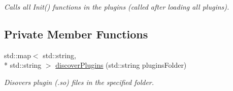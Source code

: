 \begin{DoxyCompactItemize}
\begin{DoxyCompactList}\small\item\em Calls all Init() functions in the plugins (called after loading all plugins). \end{DoxyCompactList}\end{DoxyCompactItemize}
\subsection*{Private Member Functions}
\begin{DoxyCompactItemize}
\item 
\hypertarget{classPluginManager_a6e1d97e5b23f0d8f003a518b8b5fb7a1}{std\-::map$<$ std\-::string, \\*
std\-::string $>$ \hyperlink{classPluginManager_a6e1d97e5b23f0d8f003a518b8b5fb7a1}{discover\-Plugins} (std\-::string plugins\-Folder)}\label{classPluginManager_a6e1d97e5b23f0d8f003a518b8b5fb7a1}

\begin{DoxyCompactList}\small\item\em Disovers plugin (.so) files in the specified folder. \end{DoxyCompactList}\end{DoxyCompactItemize}

